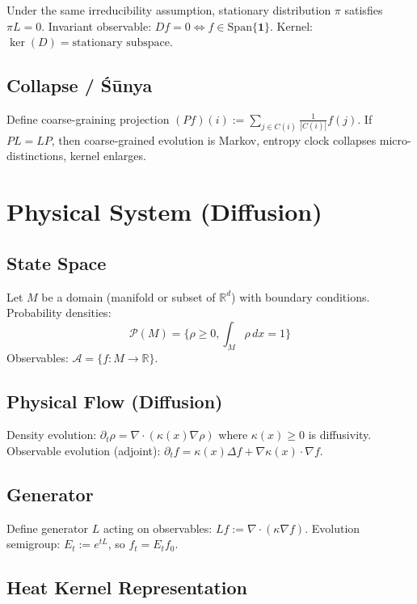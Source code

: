 \documentclass[12pt, oneside]{article}
\begin{document}
Under the same irreducibility assumption, stationary distribution $\pi$ satisfies $\pi L = 0$. Invariant observable: $Df = 0 \iff f \in \text{Span}\{\mathbf{1}\}$. Kernel: $\ker(D) = \text{stationary subspace}$.

\subsection{Collapse / Śūnya}

Define coarse-graining projection $(Pf)(i) := \sum_{j \in C(i)} \frac{1}{|C(i)|} f(j)$. If $PL = LP$, then coarse-grained evolution is Markov, entropy clock collapses micro-distinctions, kernel enlarges.

\section{Physical System (Diffusion)}

\subsection{State Space}

Let $M$ be a domain (manifold or subset of $\mathbb{R}^d$) with boundary conditions. Probability densities:
\begin{equation}
\mathcal{P}(M) = \{\rho \geq 0, \int_M \rho \, dx = 1\}
\end{equation}
Observables: $\mathcal{A} = \{ f: M \rightarrow \mathbb{R} \}$.

\subsection{Physical Flow (Diffusion)}

Density evolution: $\partial_t \rho = \nabla \cdot (\kappa(x) \nabla \rho)$ where $\kappa(x) \geq 0$ is diffusivity. Observable evolution (adjoint): $\partial_t f = \kappa(x) \Delta f + \nabla \kappa(x) \cdot \nabla f$.

\subsection{Generator}

Define generator $L$ acting on observables: $Lf := \nabla \cdot (\kappa \nabla f)$. Evolution semigroup: $E_t := e^{tL}$, so $f_t = E_t f_0$.

\subsection{Heat Kernel Representation}
\end{document}
